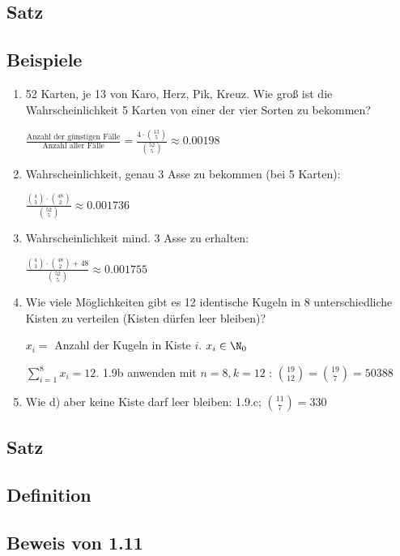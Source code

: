 
\subsection{Satz} %

\subsection{Beispiele}

\begin{enumerate}
	\item
	52 Karten, je 13 von Karo, Herz, Pik, Kreuz.
	Wie groß ist die Wahrscheinlichkeit 5 Karten von einer der vier Sorten zu bekommen?
	
	$\frac{\text{Anzahl der günstigen Fälle}}{\text{Anzahl aller Fälle}}
	= \frac{4 \cdot \binom{13}{5}}{\binom{52}{5}}
	\approx 0.00198$
	
	\item 
	Wahrscheinlichkeit, genau 3 Asse zu bekommen (bei 5 Karten):
	
	$\frac{\binom{4}{3} \cdot \binom{48}{2}}{\binom{52}{5}} \approx 0.001736$
	
	\item
	Wahrscheinlichkeit mind. 3 Asse zu erhalten:
	
	$\frac{\binom{4}{3} \cdot \binom{48}{2} + 48}{\binom{52}{5}} \approx 0.001755$
	
	\item Wie viele Möglichkeiten gibt es 12 identische Kugeln in 8 unterschiedliche Kisten zu verteilen (Kisten dürfen leer bleiben)? 
	
	$x_i = $ Anzahl der Kugeln in Kiste $i$. $x_i \in \N_0$
	
	$\sum_{i=1}^{8}x_i = 12$. 1.9b %
	anwenden mit $n=8, k=12 $ :
	$\binom{19}{12} = \binom{19}{7} = 50388$
	
	\item
	Wie d) %
	aber keine Kiste darf leer bleiben: 1.9.c; %
	$\binom{11}{7} = 330$
	
	
\end{enumerate}

\subsection{Satz} %
\subsection{Definition} %

\subsection*{Beweis von 1.11} %

